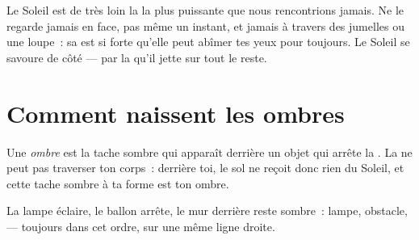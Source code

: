\begin{remark}\label{rem:g1:light-and-shadows:sun}
Le Soleil est de très loin la  la plus puissante que
nous rencontrions jamais. Ne le regarde jamais en face, pas même un
instant, et jamais à travers des jumelles ou une loupe~: sa 
est si forte qu'elle peut abîmer tes yeux pour toujours. Le Soleil se
savoure de côté --- par la  qu'il jette sur tout le reste.
\end{remark}

\section{Comment naissent les ombres}

\begin{definition}[Ombre]\label{def:g1:light-and-shadows:shadow}
Une \emph{ombre} est la tache sombre qui apparaît
derrière un objet qui arrête la . La  ne peut pas
traverser ton corps~: derrière toi, le sol ne reçoit donc rien du
Soleil, et cette tache sombre à ta forme est ton ombre.
\end{definition}

\begin{omfigure}

{\small La lampe éclaire, le ballon arrête, le mur derrière reste
sombre~: lampe, obstacle,  --- toujours dans cet ordre, sur une
même ligne droite.}
\end{omfigure}

